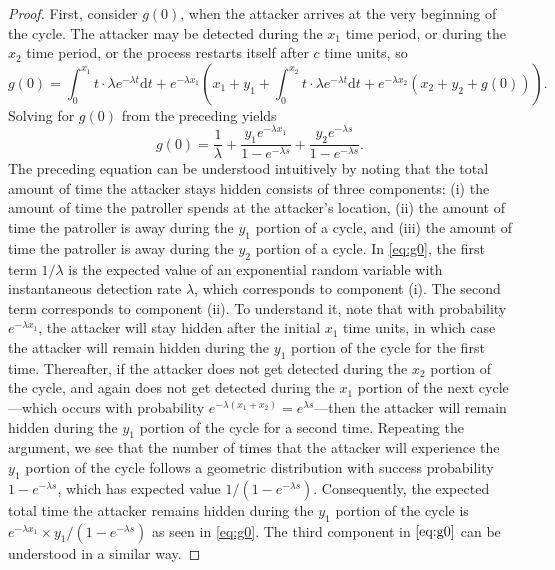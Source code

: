 \documentclass[11pt,a4paper]{article}
\begin{document}
\begin{proof}
First, consider $g(0)$, when the attacker arrives at the very beginning of the cycle.
The attacker may be detected during the $x_1$ time period, or during the $x_2$ time period, or the process restarts itself after $c$ time units, so
\begin{equation*}
g(0) = \int_0^{x_1} t \cdot \lambda e^{-\lambda t} \text{d}t + e^{-\lambda x_1} \left( x_1 + y_1 + \int_0^{x_2} t \cdot \lambda e^{-\lambda t} \text{d}t +  e^{-\lambda x_2} ( x_2 + y_2 + g(0)) \right).
\end{equation*}
Solving for $g(0)$ from the preceding yields
\begin{equation}
g(0) = \frac{1}{\lambda} +  \frac{y_1 e^{-\lambda x_1}}{1 - e^{-\lambda s}} + \frac{y_2 e^{-\lambda s}}{1 - e^{-\lambda s}} .
\label{eq:g0}
\end{equation}
The preceding equation can be understood intuitively by noting that the total amount of time the attacker stays hidden consists of three components: (i) the amount of time the patroller spends at the attacker’s location, (ii) the amount of time the patroller is away during the $y_1$ portion of a cycle, and (iii) the amount of time the patroller is away during the $y_2$ portion of a cycle.
In \eqref{eq:g0}, the first term $1/\lambda$ is the expected value of an exponential random variable with instantaneous detection rate $\lambda$, which corresponds to component (i).
The second term corresponds to component (ii).
To understand it, note that with probability $e^{-\lambda x_1}$, the attacker will stay hidden after the initial $x_1$ time units, in which case the attacker will remain hidden during the $y_1$ portion of the cycle for the first time.
Thereafter, if the attacker does not get detected during the $x_2$ portion of the cycle, and again does not get detected during the $x_1$ portion of the next cycle---which occurs with probability $e^{-\lambda (x_1 + x_2)} = e^{\lambda s}$---then the attacker will remain hidden during the $y_1$ portion of the cycle for a second time.
Repeating the argument, we see that the number of times that the attacker will experience the $y_1$ portion of the cycle follows a geometric distribution with success probability $1-e^{-\lambda s}$, which has expected value $1/ (1-e^{-\lambda s})$.
Consequently, the expected total time the attacker remains hidden during the $y_1$ portion of the cycle is $e^{-\lambda x_1} \times y_1/(1-e^{-\lambda s})$ as seen in \eqref{eq:g0}.
The third component in $\eqref{eq:g0}$ can be understood in a similar way.


\end{proof}
\end{document}

